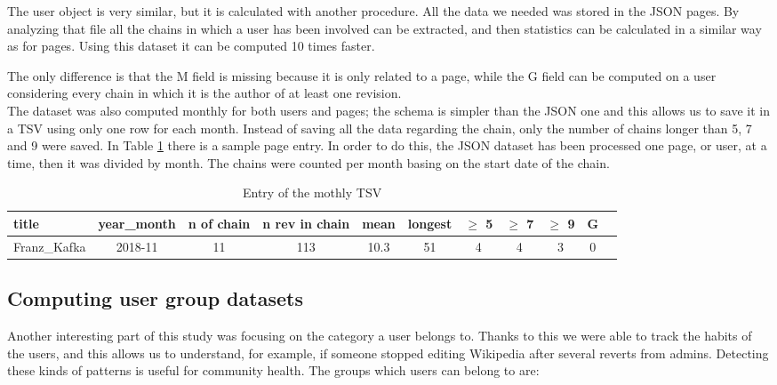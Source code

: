 The user object is very similar, but it is calculated with another procedure. All the data we needed
was stored in the JSON pages. By analyzing that file all the chains in which a user has been
involved can be extracted, and then statistics can be calculated in a similar way as for pages.
Using this dataset it can be computed 10 times faster.  

The only difference is that the M field is missing because it is only related to a page, while the G field
can be computed on a user considering every chain in which it is the author of at least one revision.\\

The dataset was also computed monthly for both users and pages; the schema is simpler than the
JSON one and this allows us to save it in a TSV using only one row for each month. Instead of saving
all the data regarding the chain, only the number of chains longer than 5, 7 and 9 were saved. In
Table \ref{table:chainsPagemonth} there is a sample page entry. In order to do this, the JSON
dataset has been processed one page, or user, at a time, then it was divided by month. The chains
were counted per month basing on the start date of the chain.   

\begin{table}[H]
    \centering
    \begin{tabularx}{\columnwidth}{@{}Xcccccccccc@{}}
        \midrule
        \textbf{title} & \textbf{year\_month} & \textbf{n of chain} & \textbf{n rev in chain} & \textbf{mean} & \textbf{longest} & \textbf{$\geq$ 5} & \textbf{$\geq$ 7} & \textbf{$\geq$ 9} & \textbf{G}\\ \toprule
        Franz\_Kafka & 2018-11 & 11 & 113 & 10.3 & 51 & 4 & 4 & 3 & 0\\
        
        \bottomrule
    \end{tabularx}
    
    \caption{Entry of the mothly TSV \label{table:chainsPagemonth}}
\end{table}


\subsection{Computing user group datasets}
Another interesting part of this study was focusing on the category a user belongs to. Thanks to this
we were able to track the habits of the users, and this allows us to understand, for example, if
someone stopped editing Wikipedia after several reverts from admins. Detecting these kinds of
patterns is useful for community health. The groups which users can belong to are: 


